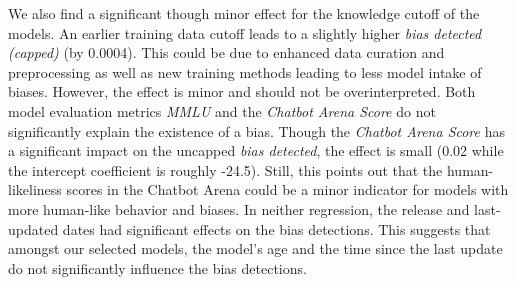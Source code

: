 \par We also find a significant though minor effect for the knowledge cutoff of the models. An earlier training data cutoff leads to a slightly higher \textit{bias detected (capped)} (by 0.0004). This could be due to enhanced data curation and preprocessing as well as new training methods leading to less model intake of biases. However, the effect is minor and should not be overinterpreted. Both model evaluation metrics \textit{MMLU} and the \textit{Chatbot Arena Score} do not significantly explain the existence of a bias. Though the \textit{Chatbot Arena Score} has a significant impact on the uncapped \textit{bias detected}, the effect is small (0.02 while the intercept coefficient is roughly -24.5). Still, this points out that the human-likeliness scores in the Chatbot Arena could be a minor indicator for models with more human-like behavior and biases. In neither regression, the release and last-updated dates had significant effects on the bias detections. This suggests that amongst our selected models, the model's age and the time since the last update do not significantly influence the bias detections.
